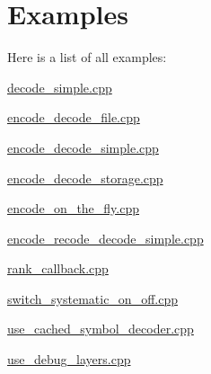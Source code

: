 \section{Examples}
Here is a list of all examples\-:\begin{DoxyCompactItemize}
\item 
\hyperlink{decode_simple_8cpp-example}{decode\-\_\-simple.\-cpp}
\item 
\hyperlink{encode_decode_file_8cpp-example}{encode\-\_\-decode\-\_\-file.\-cpp}
\item 
\hyperlink{encode_decode_simple_8cpp-example}{encode\-\_\-decode\-\_\-simple.\-cpp}
\item 
\hyperlink{encode_decode_storage_8cpp-example}{encode\-\_\-decode\-\_\-storage.\-cpp}
\item 
\hyperlink{encode_on_the_fly_8cpp-example}{encode\-\_\-on\-\_\-the\-\_\-fly.\-cpp}
\item 
\hyperlink{encode_recode_decode_simple_8cpp-example}{encode\-\_\-recode\-\_\-decode\-\_\-simple.\-cpp}
\item 
\hyperlink{rank_callback_8cpp-example}{rank\-\_\-callback.\-cpp}
\item 
\hyperlink{switch_systematic_on_off_8cpp-example}{switch\-\_\-systematic\-\_\-on\-\_\-off.\-cpp}
\item 
\hyperlink{use_cached_symbol_decoder_8cpp-example}{use\-\_\-cached\-\_\-symbol\-\_\-decoder.\-cpp}
\item 
\hyperlink{use_debug_layers_8cpp-example}{use\-\_\-debug\-\_\-layers.\-cpp}
\end{DoxyCompactItemize}
